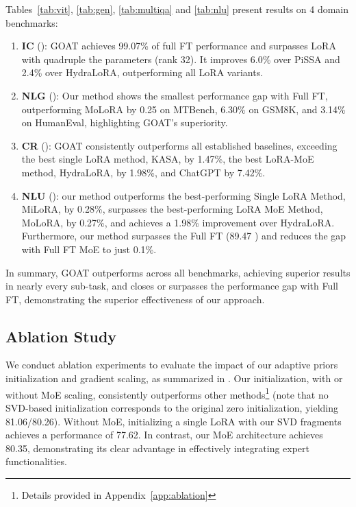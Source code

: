Tables~\ref{tab:vit}, \ref{tab:gen}, \ref{tab:multiqa} and \ref{tab:nlu} present results on 4 domain benchmarks:
\begin{enumerate}[label=\textbullet,leftmargin=*]
\item \textbf{IC} (): GOAT achieves 99.07\% of full FT performance and surpasses LoRA with quadruple the parameters (rank 32). It improves 6.0\% over PiSSA and 2.4\% over HydraLoRA, outperforming all LoRA variants.
\item \textbf{NLG} (): Our method shows the smallest performance gap with Full FT, outperforming MoLoRA by 0.25 on MTBench, 6.30\% on GSM8K, and 3.14\% on HumanEval, highlighting GOAT's superiority.
\item \textbf{CR} (): GOAT consistently outperforms all established baselines, exceeding the best single LoRA method, KASA, by 1.47\%, the best LoRA-MoE method, HydraLoRA, by 1.98\%, and ChatGPT by 7.42\%.
\item \textbf{NLU} (): our method outperforms the best-performing Single LoRA Method, MiLoRA, by 0.28\%, surpasses the best-performing LoRA MoE Method, MoLoRA, by 0.27\%, and achieves a 1.98\%  improvement over HydraLoRA. Furthermore, our method surpasses the Full FT (89.47 ) and reduces the gap with Full FT MoE to just 0.1\%. 
\end{enumerate}
In summary, GOAT outperforms across all benchmarks, achieving superior results in nearly every sub-task, and closes or surpasses the performance gap with Full FT, demonstrating the superior effectiveness of our approach.


\subsection{Ablation Study}

We conduct ablation experiments to evaluate the impact of our adaptive priors initialization and gradient scaling, as summarized in . Our initialization, with or without MoE scaling, consistently outperforms other methods\footnote{Details provided in Appendix~\ref{app:ablation}} (note that no SVD-based initialization corresponds to the original zero initialization, yielding 81.06/80.26). Without MoE, initializing a single LoRA with our SVD fragments achieves a performance of 77.62. In contrast, our MoE architecture achieves 80.35, demonstrating its clear advantage in effectively integrating expert functionalities.

